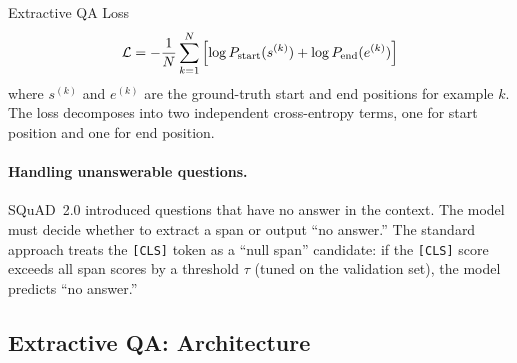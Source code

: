 \begin{mathresult}{Extractive QA Loss}
\[
    \mathcal{L} = -\frac{1}{N}\sum_{k=1}^{N}\left[
        \log P_{\text{start}}(s^{(k)}) + \log P_{\text{end}}(e^{(k)})
    \right]
\]
where $s^{(k)}$ and $e^{(k)}$ are the ground-truth start and end positions for example $k$.
The loss decomposes into two independent cross-entropy terms, one for start position and one
for end position.
\end{mathresult}

\paragraph{Handling unanswerable questions.}
SQuAD~2.0 introduced questions that have no answer in the context.  The model must decide
whether to extract a span or output ``no answer.''  The standard approach treats the
\texttt{[CLS]} token as a ``null span'' candidate: if the \texttt{[CLS]} score exceeds all
span scores by a threshold $\tau$ (tuned on the validation set), the model predicts ``no
answer.''

\subsection{Extractive QA: Architecture}

